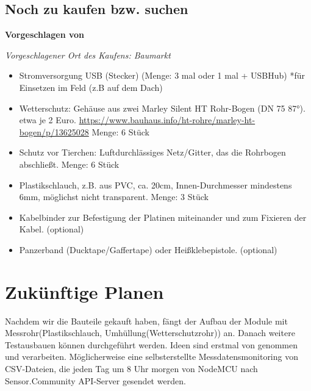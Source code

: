 \documentclass[draft=false
              ,paper=a4
              ,twoside=false
              ,fontsize=10pt
              ,headsepline
              ,BCOR10mm
              ,DIV11
              ]{article}
\begin{document}
\subsection{Noch zu kaufen bzw. suchen}
\textbf{Vorgeschlagen von \cite{bezugsquellen}}

\textit{Vorgeschlagener Ort des Kaufens: Baumarkt}

\begin{itemize}
  \item Stromversorgung USB (Stecker) (Menge: 3 mal oder 1 mal + USBHub) *für Einsetzen im Feld (z.B auf dem Dach)
  \item Wetterschutz: Gehäuse aus zwei Marley Silent HT Rohr-Bogen (DN 75 87°). etwa je 2 Euro. \url{https://www.bauhaus.info/ht-rohre/marley-ht-bogen/p/13625028} Menge: 6 Stück
  \item Schutz vor Tierchen: Luftdurchlässiges Netz/Gitter, das die Rohrbogen abschließt. Menge: 6 Stück
  \item Plastikschlauch, z.B. aus PVC, ca. 20cm, Innen-Durchmesser mindestens 6mm, möglichst nicht transparent. Menge: 3 Stück
  \item Kabelbinder zur Befestigung der Platinen miteinander und zum Fixieren der Kabel. (optional)
  \item Panzerband (Ducktape/Gaffertape) oder Heißklebepistole. (optional)
\end{itemize}

\section{Zukünftige Planen}

Nachdem wir die Bauteile gekauft haben, fängt der Aufbau der Module mit Messrohr(Plastikschlauch, Umhüllung(Wetterschutzrohr)) an.
Danach weitere Testausbauen können durchgeführt werden. Ideen sind erstmal von \cite{wiki} genommen und verarbeiten. Möglicherweise eine selbsterstellte Messdatensmonitoring von CSV-Dateien, die jeden Tag um 8 Uhr morgen von NodeMCU nach Sensor.Community API-Server gesendet werden.

\newpage
\printbibliography[title={Literatursverzeichnis}]

\end{document}
